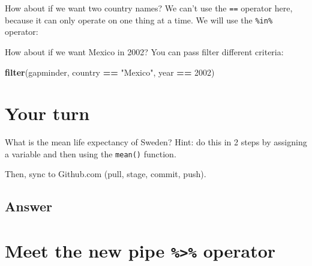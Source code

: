 \documentclass[]{book}
\newenvironment{Shaded}{\begin{snugshade}}{\end{snugshade}}
\newcommand{\KeywordTok}[1]{\textcolor[rgb]{0.13,0.29,0.53}{\textbf{#1}}}
\newcommand{\DecValTok}[1]{\textcolor[rgb]{0.00,0.00,0.81}{#1}}
\newcommand{\StringTok}[1]{\textcolor[rgb]{0.31,0.60,0.02}{#1}}
\newcommand{\OperatorTok}[1]{\textcolor[rgb]{0.81,0.36,0.00}{\textbf{#1}}}
\newcommand{\NormalTok}[1]{#1}
\theoremstyle{definition}
\theoremstyle{definition}
\theoremstyle{definition}
\theoremstyle{remark}
\begin{document}
How about if we want two country names? We can't use the \texttt{==}
operator here, because it can only operate on one thing at a time. We
will use the \texttt{\%in\%} operator:

\begin{Shaded}
\end{Shaded}

How about if we want Mexico in 2002? You can pass filter different
criteria:

\begin{Shaded}
\begin{Highlighting}[]
\KeywordTok{filter}\NormalTok{(gapminder, country }\OperatorTok{==}\StringTok{ "Mexico"}\NormalTok{, year }\OperatorTok{==}\StringTok{ }\DecValTok{2002}\NormalTok{)}
\end{Highlighting}
\end{Shaded}

\section{Your turn}\label{your-turn-5}

What is the mean life expectancy of Sweden? Hint: do this in 2 steps by
assigning a variable and then using the \texttt{mean()} function.

Then, sync to Github.com (pull, stage, commit, push).

\subsection{Answer}\label{answer}

\begin{Shaded}
\end{Shaded}

\section{\texorpdfstring{Meet the new pipe \texttt{\%\textgreater{}\%}
operator}{Meet the new pipe \%\textgreater{}\% operator}}\label{meet-the-new-pipe-operator}
\end{document}
